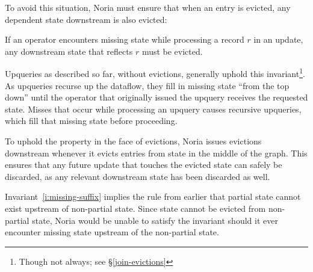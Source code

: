To avoid this situation, Noria must ensure that when an entry is evicted, any
dependent state downstream is also evicted:

\begin{invariant}
  \label{i:missing-suffix}
  If an operator encounters missing state while processing a record $r$ in an
  update, any downstream state that reflects $r$ must be evicted.
\end{invariant}

Upqueries as described so far, without evictions, generally uphold this
invariant\footnote{Though not always; see \S\ref{join-evictions}}. As upqueries
recurse up the dataflow, they fill in missing state ``from the top down'' until
the operator that originally issued the upquery receives the requested state.
Misses that occur while processing an upquery causes recursive upqueries, which
fill that missing state before proceeding.

To uphold the property in the face of evictions, Noria issues evictions
downstream whenever it evicts entries from state in the middle of the graph.
This ensures that any future update that touches the evicted state can safely be
discarded, as any relevant downstream state has been discarded as well.

Invariant~\ref{i:missing-suffix} implies the rule from earlier that partial
state cannot exist upstream of non-partial state. Since state cannot be evicted
from non-partial state, Noria would be unable to satisfy the invariant should it
ever encounter missing state upstream of the non-partial state.
